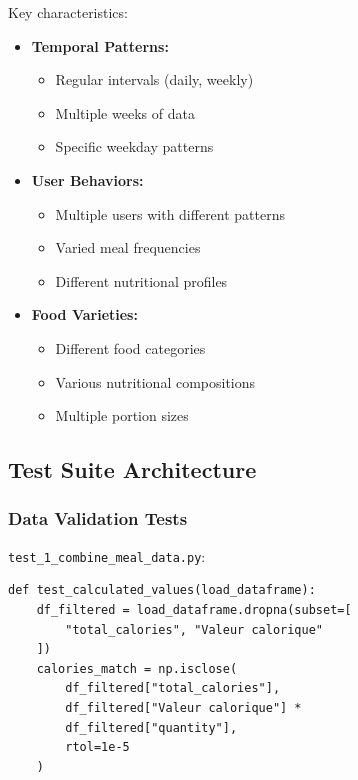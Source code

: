 Key characteristics:
\begin{itemize}
    \item \textbf{Temporal Patterns:}
    \begin{itemize}
        \item Regular intervals (daily, weekly)
        \item Multiple weeks of data
        \item Specific weekday patterns
    \end{itemize}
    
    \item \textbf{User Behaviors:}
    \begin{itemize}
        \item Multiple users with different patterns
        \item Varied meal frequencies
        \item Different nutritional profiles
    \end{itemize}
    
    \item \textbf{Food Varieties:}
    \begin{itemize}
        \item Different food categories
        \item Various nutritional compositions
        \item Multiple portion sizes
    \end{itemize}
\end{itemize}

\subsection{Test Suite Architecture}

\subsubsection{Data Validation Tests}
\texttt{test\_1\_combine\_meal\_data.py}:

\begin{lstlisting}[style=pythonstyle, caption=Data Validation]
def test_calculated_values(load_dataframe):
    df_filtered = load_dataframe.dropna(subset=[
        "total_calories", "Valeur calorique"
    ])
    calories_match = np.isclose(
        df_filtered["total_calories"],
        df_filtered["Valeur calorique"] * 
        df_filtered["quantity"],
        rtol=1e-5
    )
\end{lstlisting}

